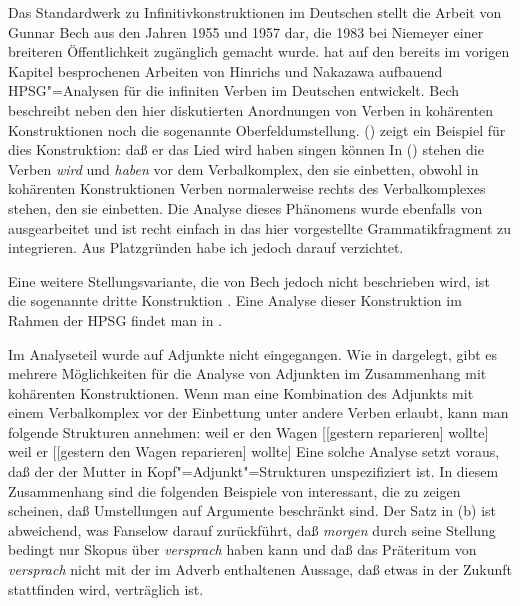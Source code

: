 {Das Standardwerk zu Infinitivkonstruktionen im Deutschen stellt die Arbeit von Gunnar Bech aus den
Jahren 1955 und 1957 dar, die 1983 bei Niemeyer einer breiteren Öffentlichkeit zugänglich gemacht
wurde. \citet{Kiss95a} hat auf den bereits im vorigen Kapitel besprochenen Arbeiten von Hinrichs und
Nakazawa aufbauend HPSG"=Analysen für die infiniten Verben im Deutschen entwickelt. Bech beschreibt
neben den hier diskutierten Anordnungen von Verben in kohärenten Konstruktionen noch die sogenannte
Oberfeldumstellung. () zeigt ein Beispiel für dies Konstruktion:
\ea
daß er das Lied wird haben singen können
\z
In () stehen die Verben \emph{wird} und \emph{haben} vor dem Verbalkomplex, den
sie einbetten, obwohl in kohärenten Konstruktionen Verben normalerweise rechts des Verbalkomplexes
stehen, den sie einbetten. Die Analyse dieses Phänomens wurde ebenfalls von
\citet{HN89b,HN94a} ausgearbeitet und ist recht einfach in das hier vorgestellte Grammatikfragment zu
integrieren. Aus Platzgründen habe ich jedoch darauf verzichtet.

Eine weitere Stellungsvariante, die von Bech jedoch nicht beschrieben wird, ist die sogenannte
dritte Konstruktion \citep*{dBR89}. Eine Analyse dieser Konstruktion im
Rahmen der HPSG findet man in .


Im 
Analyseteil wurde auf Adjunkte nicht eingegangen. Wie in  dargelegt, gibt es
mehrere Möglichkeiten für die Analyse von Adjunkten im Zusammenhang mit kohärenten
Konstruktionen. Wenn man eine Kombination des Adjunkts mit einem Verbalkomplex vor der Einbettung
unter andere Verben erlaubt, kann man folgende Strukturen annehmen:
\eal
\label{anal-adjunct-VP-Einbettung}
\ex weil er den Wagen [[gestern reparieren] wollte]
\ex weil er [[gestern den Wagen reparieren] wollte]
\zl
Eine solche Analyse setzt voraus, daß der \lexw der Mutter in Kopf"=Adjunkt"=Strukturen
unspezifiziert ist. In diesem Zusammenhang sind die folgenden Beispiele von \citet[]{Fanselow2001a} interessant, die zu zeigen scheinen, daß Umstellungen auf Argumente beschränkt
sind.
\eal
\label{bsp-adjunkte-in-kohaerenten-konstr}
\zl
Der Satz in (b) ist abweichend, was Fanselow darauf zurückführt, daß \emph{morgen}
durch seine Stellung bedingt nur Skopus über \emph{versprach} haben kann und daß das
Präteritum von \emph{versprach} nicht mit der im Adverb enthaltenen Aussage, daß etwas in
der Zukunft stattfinden wird, verträglich ist.

}
